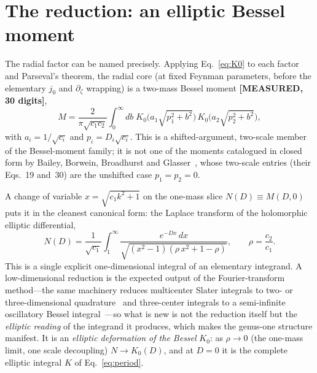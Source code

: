 \documentclass[aps,pra,twocolumn,superscriptaddress,longbibliography]{revtex4-2}
\begin{document}
\section{The reduction: an elliptic Bessel moment}
\label{sec:reduction}

The radial factor can be named precisely.  Applying Eq.~\eqref{eq:K0} to each
factor and Parseval's theorem, the radial core (at fixed Feynman parameters,
before the elementary $j_{0}$ and $\partial_{\zeta}$ wrapping) is a two-mass
Bessel moment \textbf{[MEASURED, 30 digits]},
%
\begin{equation}
  M = \frac{2}{\pi\sqrt{c_{1}c_{2}}}
  \int_{0}^{\infty}\!\! db\;
  K_{0}\!\big(a_{1}\sqrt{p_{1}^{2}+b^{2}}\big)\,
  K_{0}\!\big(a_{2}\sqrt{p_{2}^{2}+b^{2}}\big),
  \label{eq:besselmoment}
\end{equation}
%
with $a_{i}=1/\sqrt{c_{i}}$ and $p_{i}=D_{i}\sqrt{c_{i}}$.  This is a
shifted-argument, two-scale member of the Bessel-moment family; it is not one
of the moments catalogued in closed form by Bailey, Borwein, Broadhurst and
Glasser~\cite{bbbg2008}, whose two-scale entries (their Eqs.~19 and~30) are
the unshifted case $p_1=p_2=0$.

A change of variable $x=\sqrt{c_{1}k^{2}+1}$ on the one-mass slice
$N(D)\equiv M(D,0)$ puts it in the cleanest canonical form: the Laplace
transform of the holomorphic elliptic differential,
%
\begin{equation}
  N(D) = \frac{1}{\sqrt{c_{1}}}
  \int_{1}^{\infty}\!
  \frac{e^{-Dx}\,dx}{\sqrt{(x^{2}-1)(\rho\,x^{2}+1-\rho)}},
  \qquad \rho=\frac{c_{2}}{c_{1}}.
  \label{eq:laplace}
\end{equation}
%
This is a single explicit one-dimensional integral of an elementary
integrand.  A low-dimensional reduction is the expected output of the
Fourier-transform method---the same machinery reduces multicenter Slater
integrals to two- or three-dimensional quadrature~\cite{grotendorst_steinborn1988}
and three-center integrals to a semi-infinite oscillatory Bessel
integral~\cite{safouhi2001}---so what is new is not the reduction itself but the
\emph{elliptic reading} of the integrand it produces, which makes the genus-one
structure manifest.
It is an \emph{elliptic deformation of the Bessel} $K_{0}$: as $\rho\to0$
(the one-mass limit, one scale decoupling) $N\to K_{0}(D)$, and at $D=0$ it is the complete elliptic
integral $K$ of Eq.~\eqref{eq:period}.
\end{document}
